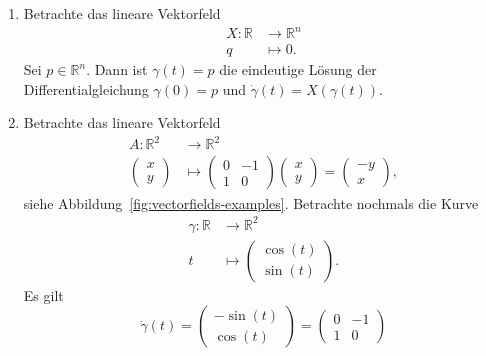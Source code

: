 \documentclass[../main.tex]{subfiles}
\begin{document}
\begin{examples}
  \leavevmode
  \begin{enumerate}[(1)]
    \item Betrachte das lineare Vektorfeld
      \begin{align*}
        X \colon \mathbb{R} & \to \mathbb{R}^n \\
        q & \mapsto 0.
      \end{align*}
      Sei $p \in \mathbb{R}^n$. Dann ist $\gamma(t) = p$ 
      die eindeutige
      Lösung der Differentialgleichung $\gamma(0) = p$ 
      und $\dot \gamma(t) = X(\gamma(t))$.
    \item Betrachte das lineare Vektorfeld
      \begin{align*}
        A \colon \mathbb{R}^2 & \to \mathbb{R}^2 \\
        \begin{pmatrix}
          x \\ y
        \end{pmatrix}
         & \mapsto 
         \begin{pmatrix}
           0 & -1 \\ 1 & 0
         \end{pmatrix}
         \begin{pmatrix}
           x \\ y
         \end{pmatrix}
         =
         \begin{pmatrix}
           -y \\ x
         \end{pmatrix},
      \end{align*}
      siehe Abbildung~\ref{fig:vectorfields-examples}.
      Betrachte nochmals die Kurve
      \begin{align*}
        \gamma \colon \mathbb{R} & \to \mathbb{R}^2 \\
        t & \mapsto 
        \begin{pmatrix}
          \cos(t) \\ \sin(t)
        \end{pmatrix}.
      \end{align*}
      Es gilt
      \[
        \dot \gamma(t) =
        \begin{pmatrix}
          - \sin(t) \\ \cos(t)
        \end{pmatrix}
        =
        \begin{pmatrix}
          0 & -1 \\ 1 & 0

\end{pmatrix}\]
\end{enumerate}
\end{examples}
\end{document}
